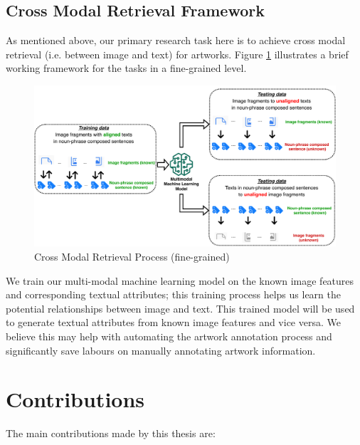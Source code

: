 \subsection{Cross Modal Retrieval Framework}

As mentioned above, our primary research task here is to achieve cross modal retrieval (i.e. between image and text) for artworks. Figure \ref{fig:framework} illustrates a brief working framework for the tasks in a fine-grained level.

\begin{figure}[h!]
\centering
\includegraphics[width=\textwidth]{framework.pdf}
\caption{Cross Modal Retrieval Process (fine-grained)}
\label{fig:framework}
\end{figure}

We train our multi-modal machine learning model on the known image features and corresponding textual attributes; this training process helps us learn the potential relationships between image and text. This trained model will be used to generate textual attributes from known image features and vice versa. We believe this may help with automating the artwork annotation process and significantly save labours on manually annotating artwork information.


\section{Contributions}
The main contributions made by this thesis are:

